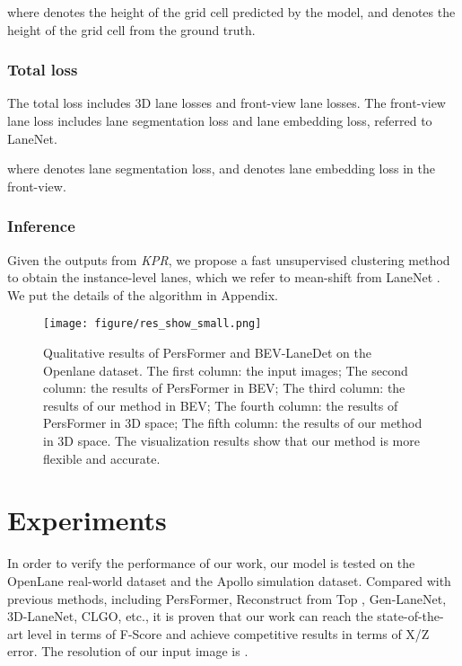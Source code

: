 \documentclass[10pt,twocolumn,letterpaper]{article}
\begin{document}
where  denotes the height of the grid cell predicted by the model, and  denotes the height of the grid cell from the ground truth.

\subsubsection{Total loss}
The total loss includes 3D lane losses and front-view lane losses. The front-view lane loss includes lane segmentation loss and lane embedding loss,  referred to LaneNet\cite{neven2018towards}.

where  denotes lane segmentation loss, and  denotes lane embedding loss in the front-view.


\subsubsection{Inference}
Given the outputs from \textit{KPR}, we propose a fast unsupervised clustering method to obtain the instance-level lanes, which we refer to mean-shift from LaneNet \cite{neven2018towards}. We put the details of the algorithm in Appendix.
\begin{figure*}[t]
    \centering
\texttt{[image: figure/res\_show\_small.png]}
\caption{Qualitative results of PersFormer\cite{chen2022persformer} and BEV-LaneDet on the Openlane dataset. The first column: the input images; The second column: the results of PersFormer in BEV; The third column: the results of our method in BEV; The fourth column:  the results of PersFormer in 3D space; The fifth column: the results of our method in 3D space. The visualization results show that our method is more flexible and accurate.}
    \label{fig:show}
\end{figure*}

\section{Experiments}
\label{sec:experiment}
In order to verify the performance of our work, our model is tested on the OpenLane real-world dataset \cite{chen2022persformer} and the Apollo simulation dataset\cite{guo2020gen}. Compared with previous methods, including PersFormer\cite{chen2022persformer}, Reconstruct from Top \cite{li2022reconstruct}, Gen-LaneNet\cite{guo2020gen}, 3D-LaneNet\cite{garnett20193d}, CLGO\cite{liu2022learning}, etc., it is proven that our work can reach the state-of-the-art level in terms of F-Score and achieve competitive results in terms of X/Z error. The resolution of our input image is .
\end{document}

